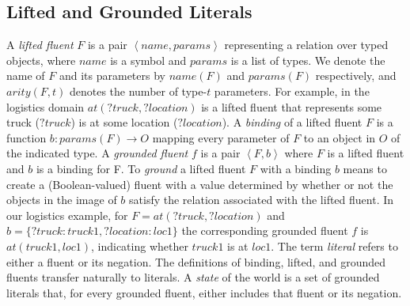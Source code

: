 \documentclass{article}
\newcommand{\tuple}[1]{\ensuremath{\left \langle #1 \right \rangle }}
\newcommand{\params}{\textit{params}}
\newcommand{\name}{\textit{name}}
\newcommand{\liftf}{F}
\begin{document}
\subsection{Lifted and Grounded Literals}
A \emph{lifted fluent} $\liftf$ is a pair $\tuple{\name, \params}$ representing a relation over typed objects, where  $\name$ is a symbol and $\params$ is a list of types. 
We denote the name of $\liftf$ and its parameters by $\name(\liftf)$ and $\params(\liftf)$ respectively, and $arity(\liftf,t)$ denotes the number of type-$t$ parameters. 
For example, in the logistics domain $at(?truck, ?location)$ is a lifted fluent that represents some truck ($?truck$) is at some location ($?location$). 
A \emph{binding} of a lifted fluent $\liftf$ is a function $b: \params(\liftf)\rightarrow O$ 
mapping every parameter of $\liftf$ to an object in $O$ of the indicated type. 
A \emph{grounded fluent} $f$ is a pair $\tuple{\liftf, b}$ where $\liftf$ is a lifted fluent 
and $b$ is a binding for \liftf. 
To \emph{ground} a lifted fluent $\liftf$ with a binding $b$ means to 
create a (Boolean-valued) fluent with a value determined by whether or not the objects in the image of $b$ satisfy the relation associated with the lifted fluent. 
In our logistics example, for $\liftf=at(?truck, ?location)$ and $b=\{?truck: truck1, ?location: loc1\}$ 
the corresponding grounded fluent $f$ is $at(truck1, loc1)$, indicating whether $truck1$ is at $loc1$.
The term \emph{literal} refers to either a fluent or its negation. 
The definitions of binding, lifted, and grounded fluents transfer naturally to literals. 
A \emph{state} of the world is a set of grounded literals that, for every grounded fluent, either includes that fluent or its negation. 


\end{document}
